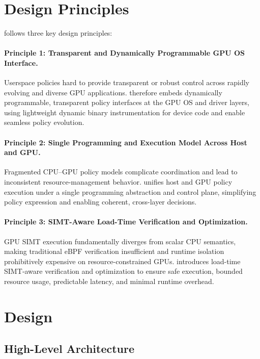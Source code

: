 \section{Design Principles}

\sys follows three key design principles:

\paragraph{Principle 1: Transparent and Dynamically Programmable GPU OS Interface.}
Userspace policies hard to provide transparent or robust control across rapidly evolving and diverse GPU applications. \sys therefore embeds dynamically programmable, transparent policy interfaces at the GPU OS and driver layers, using lightweight dynamic binary instrumentation for device code and enable seamless policy evolution.

\paragraph{Principle 2: Single Programming and Execution Model Across Host and GPU.}
Fragmented CPU–GPU policy models complicate coordination and lead to inconsistent resource-management behavior. \sys unifies host and GPU policy execution under a single programming abstraction and control plane, simplifying policy expression and enabling coherent, cross-layer decisions.

\paragraph{Principle 3: SIMT-Aware Load-Time Verification and Optimization.}
GPU SIMT execution fundamentally diverges from scalar CPU semantics, making traditional eBPF verification insufficient and runtime isolation prohibitively expensive on resource-constrained GPUs. \sys introduces load-time SIMT‑aware verification and optimization to ensure safe execution, bounded resource usage, predictable latency, and minimal runtime overhead.

\section{\sys Design}

\subsection{High-Level Architecture}
\label{sec:arch}

